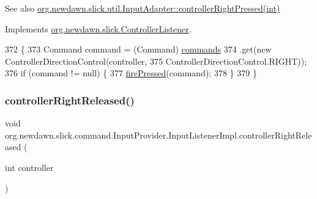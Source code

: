 \begin{DoxySeeAlso}{See also}
\mbox{\hyperlink{classorg_1_1newdawn_1_1slick_1_1util_1_1_input_adapter_a558dd87511a7ab61be9d895476e91444}{org.\+newdawn.\+slick.\+util.\+Input\+Adapter\+::controller\+Right\+Pressed(int)}} 
\end{DoxySeeAlso}


Implements \mbox{\hyperlink{interfaceorg_1_1newdawn_1_1slick_1_1_controller_listener_ae4ac64996df9778c4987705275792780}{org.\+newdawn.\+slick.\+Controller\+Listener}}.


\begin{DoxyCode}
372                                                            \{
373             Command command = (Command) \mbox{\hyperlink{classorg_1_1newdawn_1_1slick_1_1command_1_1_input_provider_ab2bd0c08506a59bc7457d7a87cf873d2}{commands}}
374                     .\textcolor{keyword}{get}(\textcolor{keyword}{new} ControllerDirectionControl(controller,
375                             ControllerDirectionControl.RIGHT));
376             \textcolor{keywordflow}{if} (command != null) \{
377                 \mbox{\hyperlink{classorg_1_1newdawn_1_1slick_1_1command_1_1_input_provider_a82cd36086b5780ccce446717e8075e96}{firePressed}}(command);
378             \}
379         \}
\end{DoxyCode}
\mbox{\label{classorg_1_1newdawn_1_1slick_1_1command_1_1_input_provider_1_1_input_listener_impl_a5703b6c8734b6d797edeecf4c3e27985}} 
\subsubsection{\texorpdfstring{controller\+Right\+Released()}{controllerRightReleased()}}
{\footnotesize\ttfamily void org.\+newdawn.\+slick.\+command.\+Input\+Provider.\+Input\+Listener\+Impl.\+controller\+Right\+Released (\begin{DoxyParamCaption}\item[{int}]{controller }\end{DoxyParamCaption})\hspace{0.3cm}{\ttfamily [inline]}}

